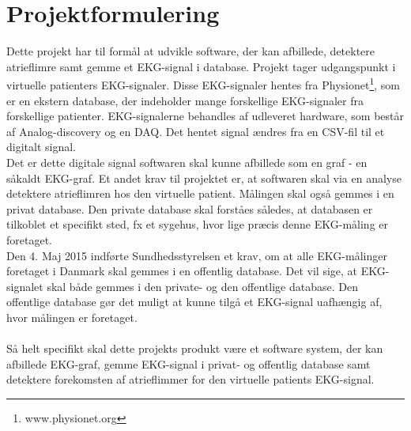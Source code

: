 \chapter{Projektformulering}

Dette projekt har til formål at udvikle software, der kan afbillede, detektere atrieflimre samt gemme et EKG-signal i database. Projekt tager udgangspunkt i virtuelle patienters EKG-signaler. Disse EKG-signaler hentes fra Physionet\footnote{www.physionet.org}, som er en ekstern database, der indeholder mange forskellige EKG-signaler fra forskellige patienter. EKG-signalerne behandles af udleveret hardware, som består af Analog-discovery og en DAQ. Det hentet signal ændres fra en CSV-fil til et digitalt signal. \\
Det er dette digitale signal softwaren skal kunne afbillede som en graf - en såkaldt EKG-graf. Et andet krav til projektet er, at softwaren skal via en analyse detektere atrieflimren hos den virtuelle patient. Målingen skal også gemmes i en privat database. Den private database skal forståes således, at databasen er tilkoblet et specifikt sted, fx et sygehus, hvor lige præcis denne EKG-måling er foretaget. \\
Den 4. Maj 2015 indførte Sundhedsstyrelsen et krav, om at alle EKG-målinger foretaget i Danmark skal gemmes i en offentlig database. Det vil sige, at EKG-signalet skal både gemmes i den private- og den offentlige database. Den offentlige database gør det muligt at kunne tilgå et EKG-signal uafhængig af, hvor målingen er foretaget.\\ \\
Så helt specifikt skal dette projekts produkt være et software system, der kan afbillede EKG-graf, gemme EKG-signal i privat- og offentlig database samt detektere forekomsten af atrieflimmer for den virtuelle patients EKG-signal.  